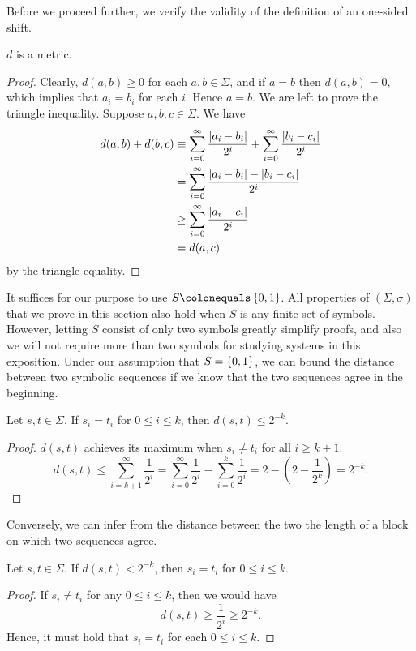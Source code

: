 \documentclass[10pt,twoside]{book}
\begin{document}
Before we proceed further, we verify the validity of the definition of an one-sided shift.
\begin{proposition}
  $d$ is a metric.
  \label{prop:symb-metric}
  \begin{proof}
    Clearly, $d(a,b) \geq 0$ for each $a,b \in \Sigma$, and if $a = b$ then $d(a,b) = 0$, which implies that $a_i = b_i$ for each $i$.
    Hence $a = b$.
    We are left to prove the triangle inequality.
    Suppose $a,b,c \in \Sigma$.
    We have
    \begin{align*}
      d(a,b) + d(b,c)
      &\equiv \sum\limits_{i = 0}^{\infty} \frac{\left | a_i - b_i \right |}{2^i}  +  \sum\limits_{i = 0}^{\infty} \frac{\left | b_i - c_i \right |}{2^i}  \\
      &= \sum\limits_{i = 0}^{\infty} \frac{\left | a_i - b_i \right | - \left | b_i - c_i \right |}{2^i}  \\
      &\geq \sum\limits_{i = 0}^{\infty} \frac{\left | a_i - c_i \right |}{2^i}  \\
      &= d(a,c)
    \end{align*}
    by the triangle equality.
  \end{proof}
\end{proposition}
It suffices for our purpose to use $S \ceq \set{0,1}$.
All properties of $(\Sigma, \sigma)$ that we prove in this section also hold when $S$ is any finite set of symbols.
However, letting $S$ consist of only two symbols greatly simplify proofs, and also we will not require more than two symbols for studying systems in this exposition.
Under our assumption that $S = \left \{ 0,1 \right \}$, we can bound the distance between two symbolic sequences if we know that the two sequences agree in the beginning.
\begin{proposition}
  Let $s, t \in \Sigma$.
  If $s_i = t_i$ for $0 \leq i \leq k$, then $d(s,t) \leq 2^{-k}$.
  \label{prop:symbol-bound1}
  \begin{proof}
    $d(s,t)$ achieves its maximum when $s_i \neq t_i$ for all $i \geq k+1$.
    \begin{equation*}
      d(s,t) 
      \leq \sum\limits_{i = k+1}^{\infty} \frac{1}{2^i}
      = \sum\limits_{i = 0}^{\infty} \frac{1}{2^i} - \sum\limits_{i = 0}^{k} \frac{1}{2^i}
      = 2 - (2 - \frac{1}{2^{k}})
      = 2^{-k}.
    \end{equation*}
  \end{proof}
\end{proposition}
Conversely, we can infer from the distance between the two the length of a block on which two sequences agree.
\begin{proposition}
  Let $s, t \in \Sigma$.
  If $d(s,t) < 2^{-k}$, then $s_i = t_i$ for $0 \leq i \leq k$.
  \label{prop:symbol-bound2}
  \begin{proof}
    If $s_i \neq t_i$ for any $0 \leq i \leq k$, then we would have
    \begin{equation*}
      d(s,t) \geq \frac{1}{2^i} \geq 2^{-k}.
    \end{equation*}
    Hence, it must hold that $s_i = t_i$ for each $0 \leq i \leq k$.
  \end{proof}
\end{proposition}
\end{document}
